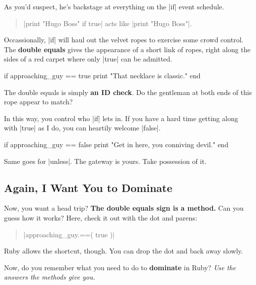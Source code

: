 \documentclass[12pt,twoside]{report}
\begin{document}
As you'd suspect, he's backstage at everything on the
\rubyinline|if| event schedule.

\begin{quote}
\rubyinline|print "Hugo Boss" if true| acts like
\rubyinline|print "Hugo Boss"|.\end{quote}


Occassionally, \rubyinline|if| will haul out the
velvet ropes to exercise some crowd control.  The {\bf double equals}
gives the appearance of a short link of ropes, right along the sides
of a red carpet where only \rubyinline|true| can be
admitted.


\begin{rubycode}

 if approaching_guy == true 
   print "That necklace is classic."  
 end

\end{rubycode}


The double equals is simply {\bf an ID check}.  Do the gentleman at
both ends of this rope appear to match?

In this way, you control who \rubyinline|if| lets in.
If you have a hard time getting along with
\rubyinline|true| as I do, you can heartily welcome
\rubyinline|false|.


\begin{rubycode}

 if approaching_guy == false 
   print "Get in here, you conniving devil."
 end

\end{rubycode}


Same goes for \rubyinline|unless|.  The gateway is
yours.  Take possession of it.



\subsection{Again, I Want You to Dominate}



Now, you want a head trip?  {\bf The double equals sign is a method.}
Can you guess how it works?  Here, check it out with the dot and
parens:

\begin{quote}
\rubyinline|approaching_guy.==( true )|\end{quote}


Ruby allows the shortcut, though.  You can drop the dot and back away
slowly.

Now, do you remember what you need to do to {\bf dominate} in Ruby?
{\em Use the answers the methods give you.}
\end{document}
